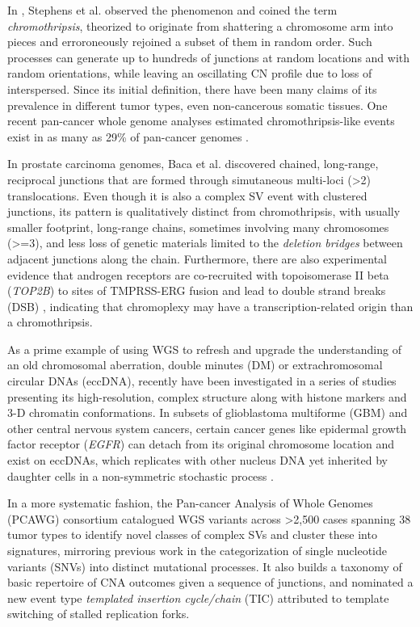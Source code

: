 \documentclass[phd,tocprelim]{cornell}
\begin{document}
In \cite{stephens2011}, Stephens et al. observed the phenomenon and coined the term \textit{chromothripsis}, theorized to originate from shattering a chromosome arm into pieces and erroroneously rejoined a subset of them in random order. Such processes can generate up to hundreds of junctions at random locations and with random orientations, while leaving an oscillating CN profile due to loss of interspersed. Since its initial definition, there have been many claims of its prevalence in different tumor types, even non-cancerous somatic tissues. One recent pan-cancer whole genome analyses estimated chromothripsis-like events exist in as many as 29\% of pan-cancer genomes \cite{Cortes-Ciriano2020-fx}.

In prostate carcinoma genomes, Baca et al. \cite{baca2013} discovered chained, long-range, reciprocal junctions that are formed through simutaneous multi-loci (>2) translocations. Even though it is also a complex SV event with clustered junctions, its pattern is qualitatively distinct from chromothripsis, with usually smaller footprint, long-range chains, sometimes involving many chromosomes (>=3), and less loss of genetic materials limited to the \textit{deletion bridges} between adjacent junctions along the chain. Furthermore, there are also experimental evidence that androgen receptors are co-recruited with topoisomerase II beta (\textit{TOP2B}) to sites of TMPRSS-ERG fusion and lead to double strand breaks (DSB) \cite{Haffner2010-cy}, indicating that chromoplexy may have a transcription-related origin than a chromothripsis.

As a prime example of using WGS to refresh and upgrade the understanding of an old chromosomal aberration, double minutes (DM) or extrachromosomal circular DNAs (eccDNA), recently have been investigated in a series of studies \cite{Helmsauer2020-do,Wu2019-ap,Kim2020-cu} presenting its high-resolution, complex structure along with histone markers and 3-D chromatin conformations. In subsets of glioblastoma multiforme (GBM) and other central nervous system cancers, certain cancer genes like epidermal growth factor receptor (\textit{EGFR}) can detach from its original chromosome location and exist on eccDNAs, which replicates with other nucleus DNA yet inherited by daughter cells in a non-symmetric stochastic process \cite{Gaubatz1990-da}. 

In a more systematic fashion, the Pan-cancer Analysis of Whole Genomes (PCAWG) consortium catalogued WGS variants across >2,500 cases spanning 38 tumor types\cite{pcawg_marker2020-yi} to identify novel classes of complex SVs and cluster these into signatures, mirroring previous work in the categorization of single nucleotide variants (SNVs) into distinct mutational processes\cite{Li2020-ds,Alexandrov2013-zv,Nik-Zainal2012-dc,Menghi2018-er}. It also builds a taxonomy of basic repertoire of CNA outcomes given a sequence of junctions, and nominated a new event type \textit{templated insertion cycle/chain} (TIC) attributed to template switching of stalled replication forks.
\end{document}
